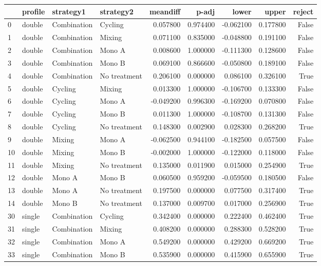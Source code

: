 \begin{tabular}{llllrrrrr}
\toprule
 & profile & strategy1 & strategy2 & meandiff & p-adj & lower & upper & reject \\
\midrule
0 & double & Combination & Cycling & 0.057800 & 0.974400 & -0.062100 & 0.177800 & False \\
1 & double & Combination & Mixing & 0.071100 & 0.835000 & -0.048800 & 0.191100 & False \\
2 & double & Combination & Mono A & 0.008600 & 1.000000 & -0.111300 & 0.128600 & False \\
3 & double & Combination & Mono B & 0.069100 & 0.866600 & -0.050800 & 0.189100 & False \\
4 & double & Combination & No treatment & 0.206100 & 0.000000 & 0.086100 & 0.326100 & True \\
5 & double & Cycling & Mixing & 0.013300 & 1.000000 & -0.106700 & 0.133300 & False \\
6 & double & Cycling & Mono A & -0.049200 & 0.996300 & -0.169200 & 0.070800 & False \\
7 & double & Cycling & Mono B & 0.011300 & 1.000000 & -0.108700 & 0.131300 & False \\
8 & double & Cycling & No treatment & 0.148300 & 0.002900 & 0.028300 & 0.268200 & True \\
9 & double & Mixing & Mono A & -0.062500 & 0.944100 & -0.182500 & 0.057500 & False \\
10 & double & Mixing & Mono B & -0.002000 & 1.000000 & -0.122000 & 0.118000 & False \\
11 & double & Mixing & No treatment & 0.135000 & 0.011900 & 0.015000 & 0.254900 & True \\
12 & double & Mono A & Mono B & 0.060500 & 0.959200 & -0.059500 & 0.180500 & False \\
13 & double & Mono A & No treatment & 0.197500 & 0.000000 & 0.077500 & 0.317400 & True \\
14 & double & Mono B & No treatment & 0.137000 & 0.009700 & 0.017000 & 0.256900 & True \\
30 & single & Combination & Cycling & 0.342400 & 0.000000 & 0.222400 & 0.462400 & True \\
31 & single & Combination & Mixing & 0.408200 & 0.000000 & 0.288300 & 0.528200 & True \\
32 & single & Combination & Mono A & 0.549200 & 0.000000 & 0.429200 & 0.669200 & True \\
33 & single & Combination & Mono B & 0.535900 & 0.000000 & 0.415900 & 0.655900 & True \\

\end{tabular}
